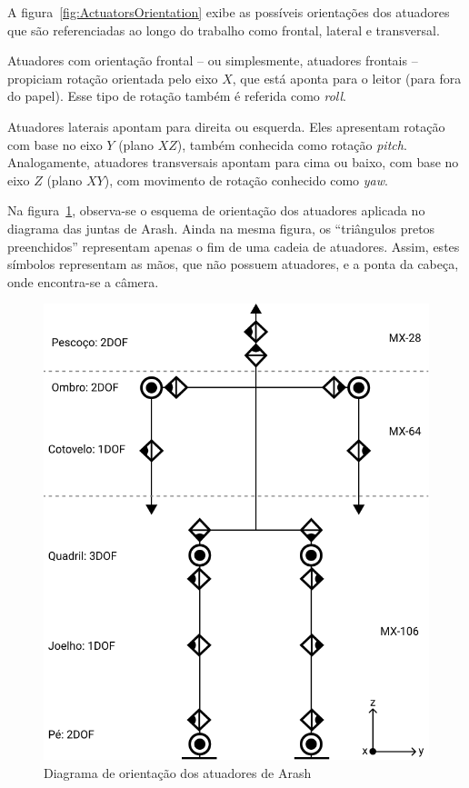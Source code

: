 A figura~\ref{fig:ActuatorsOrientation} exibe as possíveis orientações dos atuadores que são referenciadas ao longo do trabalho como frontal, lateral e transversal.

Atuadores com orientação frontal -- ou simplesmente, atuadores frontais -- propiciam rotação orientada pelo eixo $X$, que está aponta para o leitor (para fora do papel). Esse tipo de rotação também é referida como \textit{roll}.

Atuadores laterais apontam para direita ou esquerda. Eles apresentam rotação com base no eixo $Y$ (plano $XZ$), também conhecida como rotação \textit{pitch}. Analogamente, atuadores transversais apontam para cima ou baixo, com base no eixo $Z$ (plano $XY$), com movimento de rotação conhecido como \textit{yaw}.

Na figura~\ref{fig:architecture:arash:actuators_orientations}, observa-se o esquema de orientação dos atuadores aplicada no diagrama das juntas de Arash. Ainda na mesma figura, os ``triângulos pretos preenchidos'' representam apenas o fim de uma cadeia de atuadores. Assim, estes símbolos representam as mãos, que não possuem atuadores, e a ponta da cabeça, onde encontra-se a câmera. 

\begin{figure}[htb]
	\centering
	\includegraphics[scale=1]{imagens/svg/arash-schematics}
	\caption{Diagrama de orientação dos atuadores de Arash}
	\label{fig:architecture:arash:actuators_orientations}
\end{figure}

